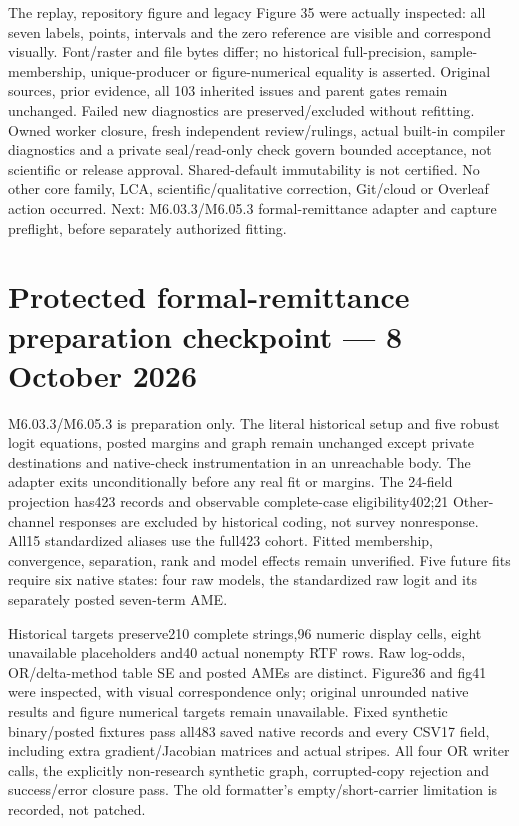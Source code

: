 \documentclass[11pt,a4paper]{article}
\begin{document}
The replay, repository figure and legacy Figure 35 were actually inspected: all seven labels, points, intervals and the zero reference are visible and correspond visually. Font/raster and file bytes differ; no historical full-precision, sample-membership, unique-producer or figure-numerical equality is asserted. Original sources, prior evidence, all 103 inherited issues and parent gates remain unchanged. Failed new diagnostics are preserved/excluded without refitting. Owned worker closure, fresh independent review/rulings, actual built-in compiler diagnostics and a private seal/read-only check govern bounded acceptance, not scientific or release approval. Shared-default immutability is not certified. No other core family, LCA, scientific/qualitative correction, Git/cloud or Overleaf action occurred. Next: M6.03.3/M6.05.3 formal-remittance adapter and capture preflight, before separately authorized fitting.
\section*{Protected formal-remittance preparation checkpoint --- 8 October 2026}
M6.03.3/M6.05.3 is preparation only. The literal historical setup and five
robust logit equations, posted margins and graph remain unchanged except
private destinations and native-check instrumentation in an unreachable body.
The adapter exits unconditionally before any real fit or margins. The
24-field projection has423 records and observable complete-case
eligibility402;21 Other-channel responses are excluded by historical coding,
not survey nonresponse. All15 standardized aliases use the full423 cohort.
Fitted membership, convergence, separation, rank and model effects remain
unverified. Five future fits require six native states: four raw models,
the standardized raw logit and its separately posted seven-term AME.

Historical targets preserve210 complete strings,96 numeric display cells,
eight unavailable placeholders and40 actual nonempty RTF rows. Raw log-odds,
OR/delta-method table SE and posted AMEs are distinct. Figure36 and fig41
were inspected, with visual correspondence only; original unrounded native
results and figure numerical targets remain unavailable. Fixed synthetic
binary/posted fixtures pass all483 saved native records and every CSV17
field, including extra gradient/Jacobian matrices and actual stripes. All
four OR writer calls, the explicitly non-research synthetic graph,
corrupted-copy rejection and success/error closure pass. The old formatter's
empty/short-carrier limitation is recorded, not patched.
\end{document}
